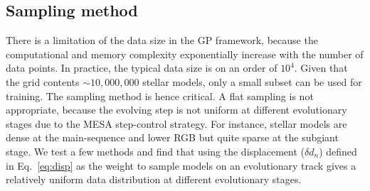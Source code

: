 \subsection{Sampling method}\label{sec:selection}

%
There is a limitation of the data size in the GP framework, because the computational and memory complexity exponentially increase with the number of data points. In practice, the typical data size is on an order of $10^{4}$. Given that the grid contents $\sim 10,000,000$ stellar models, only a small subset can be used for training. The sampling method is hence critical.
%
 A flat sampling is not appropriate, because the evolving step is not uniform at different evolutionary stages due to the \textsc{MESA} step-control strategy. For instance, stellar models are dense at the main-sequence and lower RGB but quite sparse at the subgiant stage. We test a few methods and find that using the displacement ($\delta d_{n}$) defined in Eq.~\ref{eq:disp} as the weight to sample models on an evolutionary track gives a relatively uniform data distribution at different evolutionary stages. 



